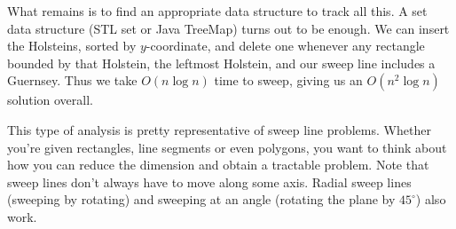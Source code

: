 What remains is to find an appropriate data structure to track all this. A set data structure (STL set or Java TreeMap) turns out to be enough. We can insert the Holsteins, sorted by $y$-coordinate, and delete one whenever any rectangle bounded by that Holstein, the leftmost Holstein, and our sweep line includes a Guernsey. Thus we take $O(n \log n)$ time to sweep, giving us an $O(n^2 \log n)$ solution overall.

This type of analysis is pretty representative of sweep line problems. Whether you're given rectangles, line segments or even polygons, you want to think about how you can reduce the dimension and obtain a tractable problem. Note that sweep lines don't always have to move along some axis. Radial sweep lines (sweeping by rotating) and sweeping at an angle (rotating the plane by $45^\circ$) also work. 
